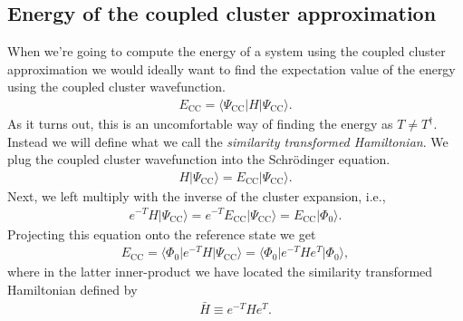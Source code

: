 \documentclass[
    a4paper, aps, twocolumn, floatfix, superscriptaddress,
    nofootinbib]{revtex4-1}
\newcommand{\1}{\mathds{1}}
\newcommand{\bra}[1]{\langle #1\lvert}
\newcommand{\ket}[1]{\rvert #1\rangle}
\newcommand{\kslat}{\ket{\Phi_0}}
\newcommand{\bslat}{\bra{\Phi_0}}
\newcommand{\kcc}{\ket{\Psi_{\text{CC}}}}
\newcommand{\bcc}{\bra{\Psi_{\text{CC}}}}
\newcommand{\ecc}{E_{\text{CC}}}
\begin{document}
    \subsection{Energy of the coupled cluster approximation}
        When we're going to compute the energy of a system using the coupled
        cluster approximation we would ideally want to find the expectation
        value of the energy using the coupled cluster wavefunction.
        \begin{align}
            \ecc = \bcc H\kcc.
        \end{align}
        As it turns out, this is an uncomfortable way of finding the energy
        as $T \neq T^{\dagger}$. Instead we will define what we call the
        \emph{similarity transformed Hamiltonian}. We plug the coupled
        cluster wavefunction into the Schrödinger equation.
        \begin{align}
            H\kcc = \ecc\kcc.
        \end{align}
        Next, we left multiply with the inverse of the cluster expansion,
        i.e.,
        \begin{align}
            e^{-T}H\kcc = e^{-T}\ecc\kcc
            = \ecc \kslat.
            \label{eq:clean_schrodinger}
        \end{align}
        Projecting this equation onto the reference state we get
        \begin{align}
            \ecc = \bslat e^{-T}H\kcc
            = \bslat e^{-T}He^{T}\kslat,
        \end{align}
        where in the latter inner-product we have located the similarity
        transformed Hamiltonian defined by
        \begin{align}
            \bar{H} \equiv e^{-T}He^{T}.
            \label{eq:similarity_transformed_hamiltonian}
        \end{align}
\end{document}
